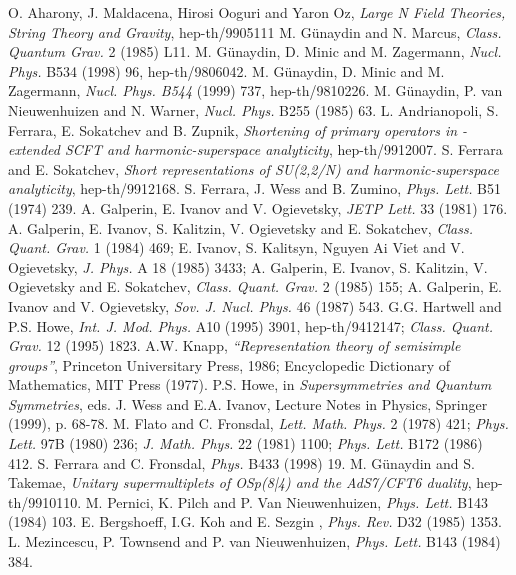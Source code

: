 \documentclass[a4paper,12pt]{article}
\begin{document}
\begin{thebibliography}{99}


 O. Aharony, J. Maldacena, Hirosi Ooguri and Yaron Oz, {\it Large N Field Theories, String Theory and 
Gravity}, hep-th/9905111 
M. G\"unaydin and N. Marcus, {\it Class. Quantum Grav.} 2 (1985) 
L11.
M. G\"unaydin, D. Minic and  M. Zagermann, {\it Nucl. Phys.} B534 
(1998) 96, hep-th/9806042. 
M. G\"unaydin, D. Minic and  M. Zagermann, {\it Nucl. Phys. B544} 
(1999) 737, hep-th/9810226. 
 M. G\"unaydin, P. van Nieuwenhuizen and N. Warner, 
{\it Nucl. Phys.} B255 (1985) 63. 
 L. Andrianopoli, S. Ferrara, E. Sokatchev and B. Zupnik, 
{\it Shortening of primary operators in \coordHE{}-extended SCFT\coordHE{} and 
harmonic-superspace analyticity}, hep-th/9912007. 
 S. Ferrara and E. Sokatchev,  
{\it Short representations of SU(2,2/N) and harmonic-superspace 
analyticity}, hep-th/9912168. 
S. Ferrara, J. Wess and B. Zumino, {\it Phys. Lett.} B51 (1974) 
239.
 A. 
Galperin, E. Ivanov and V. Ogievetsky, {\it JETP Lett.} 33 (1981) 
176.  
 A. Galperin, E. Ivanov, S. Kalitzin, V. Ogievetsky and
E. Sokatchev, {\it Class. Quant. Grav.} 1 (1984) 469; E. Ivanov, 
S. Kalitsyn, Nguyen Ai Viet and V. Ogievetsky, {\it J. Phys.}  A 
18 (1985) 3433; A. Galperin, E. Ivanov, S. Kalitzin, V. Ogievetsky 
and E. Sokatchev, {\it Class. Quant. Grav.}  2 (1985) 155; A. 
Galperin, E. Ivanov and V. Ogievetsky, {\it Sov. J. Nucl. Phys.} 
46 (1987) 543. 
G.G. Hartwell and P.S. Howe, {\it Int. J. Mod. Phys.} A10 (1995) 
3901, hep-th/9412147; {\it Class. Quant. Grav.}  12 (1995) 1823.
A.W. Knapp, {\sl ``Representation theory of semisimple groups''}, 
Princeton Universitary Press, 1986; Encyclopedic Dictionary of 
Mathematics, MIT Press (1977). 
 P.S. Howe, in {\it Supersymmetries and Quantum 
Symmetries}, eds. J. Wess and E.A. Ivanov, Lecture Notes in 
Physics, Springer (1999), p. 68-78. 
M. Flato and C. Fronsdal, {\it Lett. Math. Phys.} 2 (1978) 421; 
{\it Phys. Lett.} 97B (1980) 236; {\it J. Math. Phys.} 22 (1981) 
1100; {\it Phys. Lett.} B172 (1986) 412.
 S. Ferrara and C. Fronsdal, {\it  Phys.} B433 (1998) 19.
 M. G\"unaydin and S. Takemae, {\it Unitary supermultiplets 
of OSp(8|4) and the AdS7/CFT6 duality}, hep-th/9910110. 
 M. Pernici, K. Pilch and P. Van Nieuwenhuizen, 
{\it  Phys. Lett.} B143 (1984) 103. 
 E. Bergshoeff, I.G. Koh and E. Sezgin , {\it Phys. Rev.} D32 
(1985) 1353. 
 L. Mezincescu, P. Townsend and P. van Nieuwenhuizen, 
{\it  Phys. Lett.} B143 (1984) 384.
 

\end{thebibliography}
\end{document}
